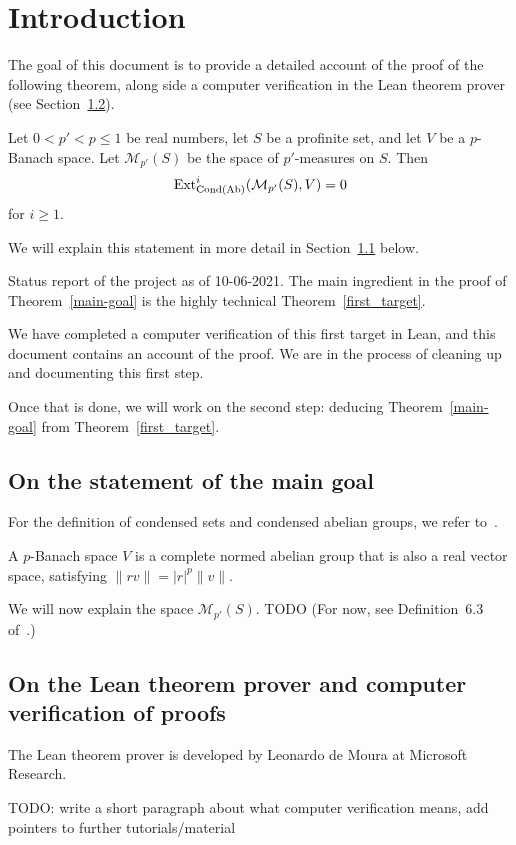 \section{Introduction}
\label{intro}

The goal of this document is to provide a detailed account
of the proof of the following theorem,
along side a computer verification in the Lean theorem prover
(see Section~\ref{on-lean}).

\begin{theorem}
  \label{main-goal}
  Let $0 < p' < p \le 1$ be real numbers,
  let $S$ be a profinite set,
  and let $V$ be a $p$-Banach space.
  Let $\mathcal M_{p'}(S)$ be the space of $p'$-measures on $S$.
  Then
  \[
    \operatorname{Ext}^i_{\operatorname{Cond}(\operatorname{Ab})}(\mathcal M_{p'}(S), V)=0
  \]
  for $i \ge 1$.
\end{theorem}

We will explain this statement in more detail in Section~\ref{on-the-statement} below.

\begin{remark}
  Status report of the project as of 10-06-2021.
  The main ingredient in the proof of Theorem~\ref{main-goal}
  is the highly technical Theorem~\ref{first_target}.

  We have completed a computer verification of this first target in Lean,
  and this document contains an account of the proof.
  We are in the process of cleaning up and documenting this first step.

  Once that is done, we will work on the second step:
  deducing Theorem~\ref{main-goal} from Theorem~\ref{first_target}.
\end{remark}

\subsection{On the statement of the main goal}
\label{on-the-statement}

For the definition of condensed sets and condensed abelian groups,
we refer to~\cite{Condensed}.

A $p$-Banach space $V$ is a complete normed abelian group
that is also a real vector space,
satisfying $\|rv\| = |r|^p\|v\|$.

We will now explain the space $\mathcal M_{p'}(S)$.
TODO
(For now, see Definition~6.3 of~\cite{Analytic}.)

\subsection{On the Lean theorem prover and computer verification of proofs}
\label{on-lean}

The Lean theorem prover is developed by Leonardo de Moura
at Microsoft Research.

TODO: write a short paragraph about what computer verification means,
add pointers to further tutorials/material

